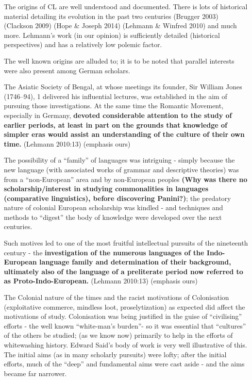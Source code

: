 The origins of CL are well understood and documented. There is lots of historical material detailing its evolution in the past two centuries (Brugger 2003) (Clackson 2009) (Hope \& Joseph 2014) (Lehmann \& Winfred 2010) and much more. Lehmann’s work (in our opinion) is sufficiently detailed (historical perspectives) and has a relatively low polemic factor.

The well known origins are alluded to; it is to be noted that parallel interests were also present among German scholars.

\begin{myquote}
The Asiatic Society of Bengal, at whose meetings its founder, Sir William Jones (1746–94), 1 delivered his influential lectures, was established in the aim of pursuing those investigations. At the same time the Romantic Movement, especially in Germany, \textbf{devoted considerable attention to the study of earlier periods, at least in part on the grounds that knowledge of simpler eras would assist an understanding of the culture of their own time.} (Lehmann 2010:13) (emphasis ours)
\end{myquote}

\newpage

The possibility of a “family” of languages was intriguing - simply because the new language (with associated works of grammar and descriptive theories) was from a “non-European” area and by non-European peoples \textbf{(Why was there no scholarship/interest in studying commonalities in languages (comparative linguistics), before discovering Panini?)}; the predatory nature of colonial European scholarship was kindled - and techniques and methods to “digest” the body of knowledge were developed over the next centuries.

\begin{myquote}
Such motives led to one of the most fruitful intellectual pursuits of the nineteenth century - the \textbf{investigation of the numerous languages of the Indo-European language family and determination of their background, ultimately also of the language of a preliterate period now referred to as Proto-Indo-European. } (Lehmann 2010:13) (emphasis ours)
\end{myquote}

The Colonial nature of the times and the racist motivations of Colonisation (exploitative commerce, mindless loot, proselytization) as expected did affect the motivations of study. Colonisation was being justified in the guise of “civilising” efforts - the well known “white-man’s burden”- so it was essential that “cultures” of the others be studied; (as we know now) primarily to help in the efforts of whitewashing history. Edward Said’s body of work is very well illustrative of this. The initial aims (as in many scholarly pursuits) were lofty; after the initial efforts, much of the “deep” and fundamental aims were cast aside - and the aims became far narrower.

